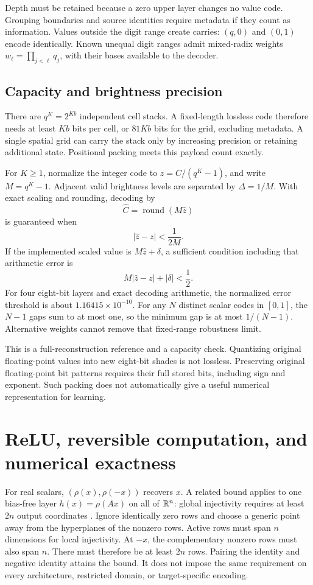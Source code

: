 Depth must be retained because a zero upper layer changes no value code.
Grouping boundaries and source identities require metadata if they count as
information. Values outside the digit range create carries:
\((q,0)\) and \((0,1)\) encode identically. Known unequal digit ranges
admit mixed-radix weights \(w_\ell=\prod_{j<\ell}q_j\), with their bases
available to the decoder.

\subsection{Capacity and brightness precision}

There are \(q^K=2^{Kb}\) independent cell stacks. A fixed-length lossless code
therefore needs at least \(Kb\) bits per cell, or \(81Kb\) bits for the grid,
excluding metadata. A single spatial grid can carry the stack only by
increasing precision or retaining additional state. Positional packing meets
this payload count exactly.

For \(K\ge1\), normalize the integer code to \(z=C/(q^K-1)\), and write
\(M=q^K-1\). Adjacent valid brightness levels are separated by
\(\Delta=1/M\). With exact scaling and rounding, decoding by
\[
 \widehat C=\operatorname{round}(M\widehat z)
\]
is guaranteed when
\[
 |\widehat z-z|<\frac1{2M}.
\]
If the implemented scaled value is \(M\widehat z+\delta\), a sufficient
condition including that arithmetic error is
\[
 M|\widehat z-z|+|\delta|<\frac12.
\]
For four eight-bit layers and exact decoding arithmetic, the normalized
error threshold is about \(1.16415\times10^{-10}\).
For any \(N\) distinct scalar codes in \([0,1]\), the \(N-1\) gaps sum to
at most one, so the minimum gap is at most \(1/(N-1)\).
Alternative weights cannot remove that fixed-range robustness limit.

This is a full-reconstruction reference and a capacity check.
Quantizing original floating-point values into new eight-bit shades is not
lossless. Preserving original floating-point bit patterns requires their full
stored bits, including sign and exponent. Such packing does not automatically
give a useful numerical representation for learning.

\section{ReLU, reversible computation, and numerical exactness}
\label{app:arithmetic}

For real scalars, \((\rho(x),\rho(-x))\) recovers \(x\).
A related bound applies to one bias-free layer
\(h(x)=\rho(Ax)\) on all of \(\mathbb R^n\): global injectivity requires at least
\(2n\) output coordinates \cite{injective}. Ignore identically zero rows
and choose a generic point away from the hyperplanes of the nonzero rows.
Active rows must span \(n\) dimensions for local injectivity.
At \(-x\), the complementary nonzero rows must also span \(n\).
There must therefore be at least \(2n\) rows. Pairing the identity and
negative identity attains the bound. It does not impose the same requirement
on every architecture, restricted domain, or target-specific encoding.

